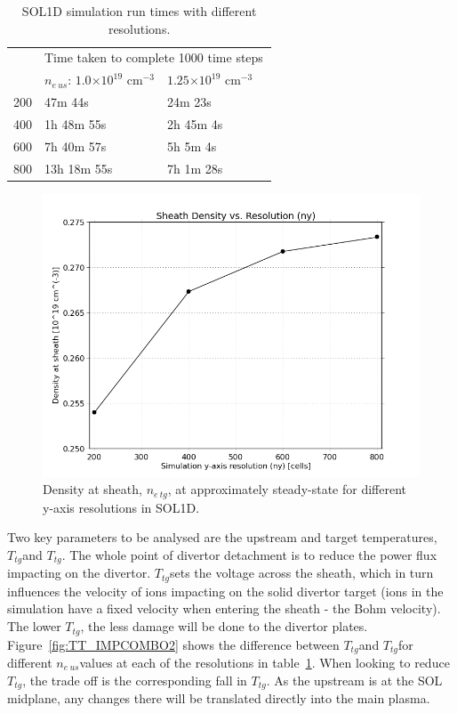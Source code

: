 \documentclass[11pt, twocolumn]{article}  %
\providecommand{\e}[1]{\ensuremath{\times 10^{#1}}} %
\providecommand{\neus}{$n_{e~us}$} %
\providecommand{\netg}{$n_{e~tg}$} %
\providecommand{\Tus}{$T_{tg}$} %
\providecommand{\Ttg}{$T_{tg}$} %
\begin{document}
\begin{table}[]
\caption{SOL1D simulation run times with different resolutions.}
\label{tab:sol1dres}
\begin{tabular}{l|l|l|l}
\multicolumn{1}{l|}{\multirow{2}{*}{}} & \multicolumn{3}{l}{Time taken to complete 1000 time steps}    \\ \cline{2-4} 
 \multicolumn{1}{l|}{Resolution}        & \multicolumn{1}{l|}{\neus: $1.0\e{19}$ cm$^{-3}$} & \multicolumn{1}{l|}{$1.25\e{19}$ cm$^{-3}$}  &  \\ \hline
                   200                 &      47m 44s          &    24m 23s         &  \\
                   400                 &      1h 48m 55s       &    2h 45m 4s       &  \\
                   600                 &      7h 40m 57s       &    5h 5m 4s        &  \\
                   800                 &      13h 18m 55s      &    7h 1m 28s       &  
\end{tabular}
\end{table}

\begin{figure}
\includegraphics[scale=0.4]{Figures/sol1d/RichExtrp_neres.png}
\centering
\caption{Density at sheath, \netg, at approximately steady-state for different y-axis resolutions in SOL1D.}\label{fig:RichExtrp_neres}
\end{figure}

Two key parameters to be analysed are the upstream and target temperatures, \Tus and \Ttg. The whole point of divertor detachment is to reduce the power flux impacting on the divertor. \Ttg sets the voltage across the sheath, which in turn influences the velocity of ions impacting on the solid divertor target (ions in the simulation have a fixed velocity when entering the sheath - the Bohm velocity). The lower \Ttg, the less damage will be done to the divertor plates. Figure~\ref{fig:TT_IMPCOMBO2} shows the difference between \Tus and \Ttg for different \neus values at each of the resolutions in table~\ref{tab:sol1dres}. When looking to reduce \Ttg, the trade off is the corresponding fall in \Tus. As the upstream is at the SOL midplane, any changes there will be translated directly into the main plasma. 
\end{document}
